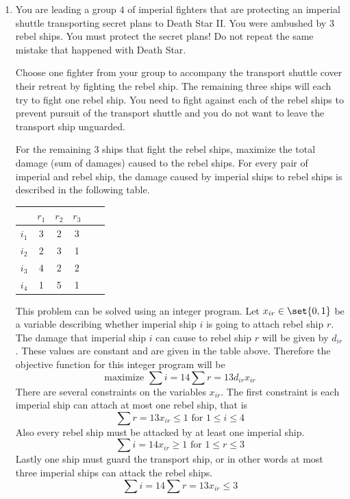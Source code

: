 \documentclass[11pt, oneside]{article}
\begin{document}
\begin{enumerate}
  \item %
    You are leading a group $4$ of imperial fighters that are protecting an
    imperial shuttle transporting secret plans to Death Star II. 
    You were ambushed by $3$ rebel ships.
    You must protect the secret plans!
    Do not repeat the same mistake that happened with Death Star.

    Choose one fighter from your group to accompany the transport shuttle cover
    their retreat by fighting the rebel ship.
    The remaining three ships will each try to fight one rebel ship.
    You need to fight against each of the rebel ships to prevent pursuit of the
    transport shuttle and you do not want to leave the transport ship unguarded.

    For the remaining 3 ships that fight the rebel ships, maximize the total
    damage (sum of damages) caused to the rebel ships.
    For every pair of imperial and rebel ship, the damage caused by imperial
    ships to rebel ships is described in the following table.
    \begin{center}
      \begin{tabular}{c|ccccc}
              & $r_1$ & $r_2$ & $r_3$ \\ \hline
        $i_1$ &    3  &     2 &     3 \\
        $i_2$ &    2  &     3 &     1 \\
        $i_3$ &    4  &     2 &     2 \\
        $i_4$ &    1  &     5 &     1 \\
      \end{tabular}
    \end{center}

    This problem can be solved using an integer program.
    Let $x_{ir} \in \set{0, 1}$ be a variable describing whether imperial ship
    $i$ is going to attach rebel ship $r$.
    The damage that imperial ship $i$ can cause to rebel ship $r$ will be given
    by $d_{ir}$.
    These values are constant and are given in the table above.
    Therefore the objective function for this integer program will be
    \[
      \text{maximize } \sum{i = 1}{4}{\sum{r = 1}{3}{d_{ir} x_{ir}}}
    \]
    There are several constraints on the variables $x_{ir}$.
    The first constraint is each imperial ship can attach at most one rebel ship,
    that is
    \[
      \sum{r = 1}{3}{x_{ir}} \le 1 \text{ for } 1 \le i \le 4
    \]
    Also every rebel ship must be attacked by at least one imperial ship.
    \[
      \sum{i = 1}{4}{x_{ir}} \ge 1 \text{ for } 1 \le r \le 3
    \]
    Lastly one ship must guard the transport ship, or in other words at most
    three imperial ships can attack the rebel ships.
    \[
      \sum{i = 1}{4}{\sum{r = 1}{3}{x_{ir}}} \le 3
    \]


\end{enumerate}
\end{document}
